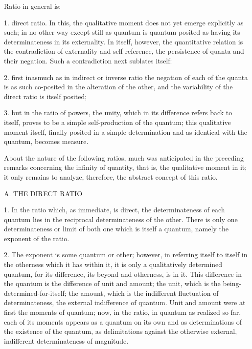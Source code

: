 Ratio in general is:

1. direct ratio.
In this, the qualitative moment does not
yet emerge explicitly as such;
in no other way except still as quantum is quantum posited
as having its determinateness in its externality.
In itself, however, the quantitative relation is
the contradiction of externality and self-reference,
the persistence of quanta and their negation.
Such a contradiction next sublates itself:

2. first inasmuch as in indirect or inverse ratio
the negation of each of the quanta is
as such co-posited in the alteration of the other,
and the variability of the direct ratio is itself posited;

3. but in the ratio of powers, the unity,
which in its difference refers back to itself,
proves to be a simple self-production of the quantum;
this qualitative moment itself,
finally posited in a simple determination
and as identical with the quantum, becomes measure.

About the nature of the following ratios,
much was anticipated in the preceding remarks
concerning the infinity of quantity, that is,
the qualitative moment in it;
it only remains to analyze, therefore,
the abstract concept of this ratio.

A. THE DIRECT RATIO

1. In the ratio which, as immediate, is direct,
the determinateness of each quantum lies in
the reciprocal determinateness of the other.
There is only one determinateness or limit of both
one which is itself a quantum,
namely the exponent of the ratio.

2. The exponent is some quantum or other;
however, in referring itself to itself
in the otherness which it has within it,
it is only a qualitatively determined quantum,
for its difference, its beyond and otherness, is in it.
This difference in the quantum is the difference of unit and amount;
the unit, which is the being-determined-for-itself;
the amount, which is the indifferent fluctuation of determinateness,
the external indifference of quantum.
Unit and amount were at first the moments of quantum;
now, in the ratio, in quantum as realized so far,
each of its moments appears as a quantum on its own
and as determinations of the existence of the quantum,
as delimitations against the otherwise
external, indifferent determinateness of magnitude.

